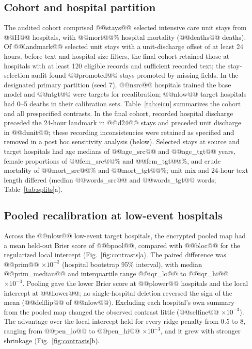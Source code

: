 \documentclass[11pt]{article}
\begin{document}
\subsection*{Cohort and hospital partition}
The audited cohort comprised @@stays@@ selected intensive care unit stays from @@H@@ hospitals, with @@mort@@\% hospital mortality (@@deaths@@ deaths). Of @@landmark@@ selected unit stays with a unit-discharge offset of at least 24 hours, before text and hospital-size filters, the final cohort retained those at hospitals with at least 120 eligible records and sufficient recorded text; the stay-selection audit found @@promoted@@ stays promoted by missing fields. In the designated primary partition (seed 7), @@nsrc@@ hospitals trained the base model and @@ntgt@@ were targets for recalibration; @@nlow@@ target hospitals had 0--5 deaths in their calibration sets. Table~\ref{tab:eicu} summarizes the cohort and all prespecified contrasts. In the final cohort, recorded hospital discharge preceded the 24-hour landmark in @@d24@@ stays and preceded unit discharge in @@dunit@@; these recording inconsistencies were retained as specified and removed in a post hoc sensitivity analysis (below). Selected stays at source and target hospitals had age medians of @@age_src@@ and @@age_tgt@@ years, female proportions of @@fem_src@@\% and @@fem_tgt@@\%, and crude mortality of @@mort_src@@\% and @@mort_tgt@@\%; unit mix and 24-hour text length differed (median @@words_src@@ and @@words_tgt@@ words; Table~\ref{tab:splits}a).

\subsection*{Pooled recalibration at low-event hospitals}
Across the @@nlow@@ low-event target hospitals, the encrypted pooled map had a mean held-out Brier score of @@bpool@@, compared with @@bloc@@ for the regularized local intercept (Fig.~\ref{fig:contrasts}a). The paired difference was @@prim@@ $\times10^{-3}$ (hospital bootstrap 95\% interval), with median @@prim_median@@ and interquartile range @@iqr_lo@@ to @@iqr_hi@@ $\times10^{-3}$. Pooling gave the lower Brier score at @@plower@@ hospitals and the local intercept at @@llower@@; no single-hospital deletion reversed the sign of the mean (@@delflip@@ of @@nlow@@). Excluding each hospital's own summary from the pooled map changed the observed contrast little (@@selfinc@@ $\times10^{-3}$). The advantage over the local intercept held for every ridge penalty from 0.5 to 8, ranging from @@pen_lo@@ to @@pen_hi@@ $\times10^{-3}$, and it grew with stronger shrinkage (Fig.~\ref{fig:contrasts}b).
\end{document}

